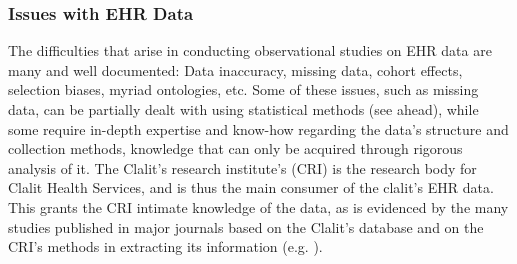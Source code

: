 \documentclass[a4paper,12pt]{article}
\begin{document}
		\subsubsection{Issues with EHR Data}
		The difficulties that arise in conducting observational studies on EHR data are many and well documented: Data inaccuracy, missing data, cohort effects, selection biases, myriad ontologies, etc\cite{Hripcsak2011,Jensen2012,Goldstein2017}. Some of these issues, such as missing data, can be partially dealt with using statistical methods (see ahead), while some require in-depth expertise and know-how regarding the data's structure and collection methods, knowledge that can only be acquired through rigorous analysis of it. The Clalit's research institute's (CRI) is the research body for Clalit Health Services, and is thus the main consumer of the clalit's EHR data. This grants the CRI intimate knowledge of the data, as is evidenced by the many studies published in major journals based on the Clalit's database and on the CRI's methods in extracting its information (e.g. \cite{Reges2018,Dagan2017}).
		
\end{document}
